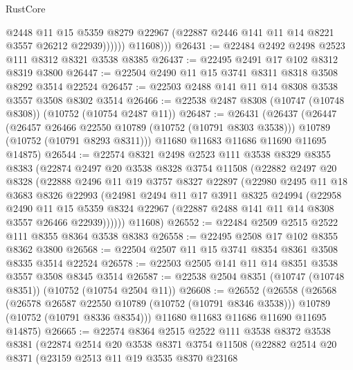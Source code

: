 \begin{lexlean}{RustCore}
\begin{coremodule}
                    @2448
                    @11
                    @15
                    @5359
                    @8279
                    @22967
                    (@22887 @2446 @141 @11 @14 @8221 @3557 @26212 @22939))))))
          @11608)))
@26431 := @22484 @2492 @2498 @2523 @111 @8312 @8321 @3538 @8385
@26437 := @22495 @2491 @17 @102 @8312 @8319 @3800
@26447 := @22504 @2490 @11 @15 @3741 @8311 @8318 @3508 @8292 @3514 @22524
@26457 := @22503 @2488 @141 @11 @14 @8308 @3538 @3557 @3508 @8302 @3514
@26466 := @22538 @2487 @8308 (@10747 (@10748 @8308)) (@10752 (@10754 @2487 @11))
@26487 := @26431
    (@26437
      (@26447
        (@26457 @26466 @22550 @10789 (@10752 (@10791 @8303 @3538)))
        @10789
        (@10752 (@10791 @8293 @8311)))
      @11680
      @11683
      @11686
      @11690
      @11695
      @14875)
@26544 := @22574
    @8321
    @2498
    @2523
    @111
    @3538
    @8329
    @8355
    @8383
    (@22874
      @2497
      @20
      @3538
      @8328
      @3754
      @11508
      (@22882
        @2497
        @20
        @8328
        (@22888
          @2496
          @11
          @19
          @3757
          @8327
          @22897
          (@22980
            @2495
            @11
            @18
            @3683
            @8326
            @22993
            (@24981
              @2494
              @11
              @17
              @3911
              @8325
              @24994
              (@22958
                @2490
                @11
                @15
                @5359
                @8324
                @22967
                (@22887 @2488 @141 @11 @14 @8308 @3557 @26466 @22939))))))
      @11608)
@26552 := @22484 @2509 @2515 @2522 @111 @8355 @8364 @3538 @8383
@26558 := @22495 @2508 @17 @102 @8355 @8362 @3800
@26568 := @22504 @2507 @11 @15 @3741 @8354 @8361 @3508 @8335 @3514 @22524
@26578 := @22503 @2505 @141 @11 @14 @8351 @3538 @3557 @3508 @8345 @3514
@26587 := @22538 @2504 @8351 (@10747 (@10748 @8351)) (@10752 (@10754 @2504 @11))
@26608 := @26552
    (@26558
      (@26568
        (@26578 @26587 @22550 @10789 (@10752 (@10791 @8346 @3538)))
        @10789
        (@10752 (@10791 @8336 @8354)))
      @11680
      @11683
      @11686
      @11690
      @11695
      @14875)
@26665 := @22574
    @8364
    @2515
    @2522
    @111
    @3538
    @8372
    @3538
    @8381
    (@22874
      @2514
      @20
      @3538
      @8371
      @3754
      @11508
      (@22882
        @2514
        @20
        @8371
        (@23159
          @2513
          @11
          @19
          @3535
          @8370
          @23168

\end{coremodule}
\end{lexlean}
